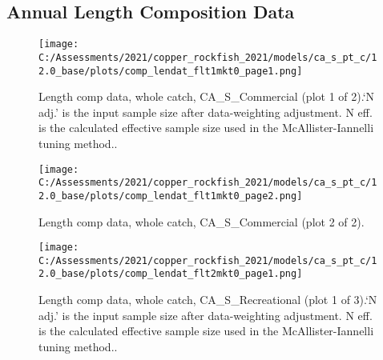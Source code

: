\documentclass[11pt,
  english,
  a4paper,
]{article}
\begin{document}
\leavevmode\tagmcend\tagstructend


\hypertarget{annual-length-composition-data}{%
\subsection{Annual Length Composition Data}\label{annual-length-composition-data}}

\leavevmode\tagmcend\tagstructend


\begin{figure}
\centering
\texttt{[image: C:/Assessments/2021/copper\_rockfish\_2021/models/ca\_s\_pt\_c/12.0\_base/plots/comp\_lendat\_flt1mkt0\_page1.png]}
\caption{Length comp data, whole catch, CA\_S\_Commercial (plot 1 of 2).`N adj.' is the input sample size after data-weighting adjustment. N eff. is the calculated effective sample size used in the McAllister-Iannelli tuning method..\label{fig:comp_lendat_flt1mkt0_page1}}
\end{figure}

\tagmcend\tagstructend


\begin{figure}
\centering
\texttt{[image: C:/Assessments/2021/copper\_rockfish\_2021/models/ca\_s\_pt\_c/12.0\_base/plots/comp\_lendat\_flt1mkt0\_page2.png]}
\caption{Length comp data, whole catch, CA\_S\_Commercial (plot 2 of 2).\label{fig:comp_lendat_flt1mkt0_page2}}
\end{figure}

\tagmcend\tagstructend


\begin{figure}
\centering
\texttt{[image: C:/Assessments/2021/copper\_rockfish\_2021/models/ca\_s\_pt\_c/12.0\_base/plots/comp\_lendat\_flt2mkt0\_page1.png]}
\caption{Length comp data, whole catch, CA\_S\_Recreational (plot 1 of 3).`N adj.' is the input sample size after data-weighting adjustment. N eff. is the calculated effective sample size used in the McAllister-Iannelli tuning method..\label{fig:comp_lendat_flt2mkt0_page1}}
\end{figure}
\end{document}
